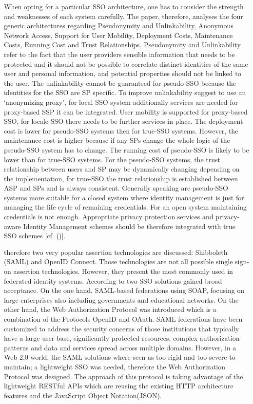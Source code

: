 {{{	When opting for a particular SSO architecture, one has to consider the strength and weaknesses of each system carefully. The paper, therefore, analyses the four generic architectures regarding Pseudonymity and Unlinkability, Anonymous Network Access, Support for User Mobility, Deployment Costs, Maintenance Costs, Running Cost and Trust Relationships. Pseudonymity and Unlinkability refer to the fact that the user providers sensible information that needs to be protected and it should not be possible to correlate distinct identities of the same user and personal information, and potential properties should not be linked to the user. The unlinkability cannot be guaranteed for pseudo-SSO because the identities for the SSO are SP specific. To improve unlinkability   \cite{Pashalidis:2003:10.1007/3-540-45067-X_22} suggest to use an ‘anonymizing proxy’, for local SSO system additionally services are needed for proxy-based SSP it can be integrated. User mobility is supported for proxy-based SSO, for locale SSO there needs to be further services in place. The deployment cost is lower for pseudo-SSO systems then for true-SSO systems. However, the maintenance cost is higher because if any SPs change the whole logic of the pseudo-SSO system has to change. The running cost of pseudo-SSO is likely to be lower than for true-SSO systems. For the pseudo-SSO systems, the trust relationship between users and SP may be dynamically changing depending on the implementation, for true-SSO the trust relationship is established between ASP and SPs and is always consistent. Generally speaking are pseudo-SSO systems more suitable for a closed system where identity management is just for managing the life cycle of remaining credentials. For an open system maintaining credentials is not enough. Appropriate privacy protection services and privacy-aware Identity Management schemes should be therefore integrated with true SSO schemes [cf. (\cite{Pashalidis:2003:10.1007/3-540-45067-X_22})]. 
	
	
	
	 therefore two very popular assertion technologies are discussed: Shibboleth (SAML) and OpenID Connect. Those technologies are not all possible single sign-on assertion technologies. However, they present the most commonly used in federated identity systems. According to \cite{Lynch:2017:IIG} two SSO solutions gained broad acceptance. On the one hand, SAML-based federations using SOAP, focusing on large enterprises also including governments and educational networks. On the other hand, the Web Authorization Protocol was introduced which is a combination of the Protocols OpenID and OAuth. SAML federations have been customized to address the security concerns of those institutions that typically have a large user base, significantly protected resources, complex authorization patterns and data and services spread across multiple domains. However, in a Web 2.0 world, the SAML solutions where seen as too rigid and too severe to maintain; a lightweight SSO was needed, therefore the Web Authorization Protocol was designed. The approach of this protocol is taking advantage of the lightweight RESTful APIs which are reusing the existing HTTP architecture features and the JavaScript Object Notation(JSON).
	
}}}
